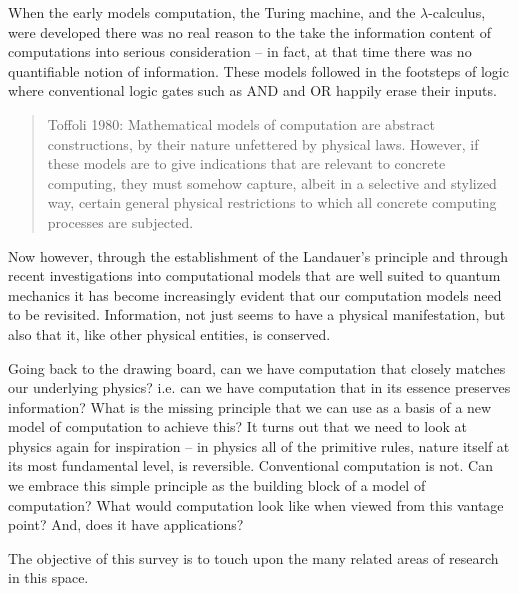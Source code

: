 \documentclass{article}
\newcommand{\jc}[1]{\fbox{Jacques says:} \textbf{#1}}
\begin{document}
When the early models computation, the Turing machine, and the
$\lambda$-calculus, were developed there was no real reason to the
take the information content of computations into serious
consideration -- in fact, at that time there was no quantifiable
notion of information. These models followed in the footsteps of logic
where conventional logic gates such as AND and OR happily erase their
inputs.

\begin{quote}
Toffoli 1980: Mathematical models of computation are abstract
constructions, by their nature unfettered by physical laws. However,
if these models are to give indications that are relevant to concrete
computing, they must somehow capture, albeit in a selective and
stylized way, certain general physical restrictions to which all
concrete computing processes are subjected.
\end{quote}

Now however, through the establishment of the Landauer's principle and
through recent investigations into computational models that are well
suited to quantum mechanics it has become increasingly evident that
our computation models need to be revisited. Information, not just
seems to have a physical manifestation, but also that it, like other
physical entities, is conserved.

Going back to the drawing board, can we have computation that closely
matches our underlying physics?  i.e. can we have computation that in
its essence preserves information? What is the missing principle that
we can use as a basis of a new model of computation to achieve this?
It turns out that we need to look at physics again for inspiration --
in physics all of the primitive rules, nature itself at its most
fundamental level, is reversible. Conventional computation is not. Can
we embrace this simple principle as the building block of a model of
computation? What would computation look like when viewed from this
vantage point? And, does it have applications?

The objective of this survey is to touch upon the many related areas
of research in this space.



\end{document}
